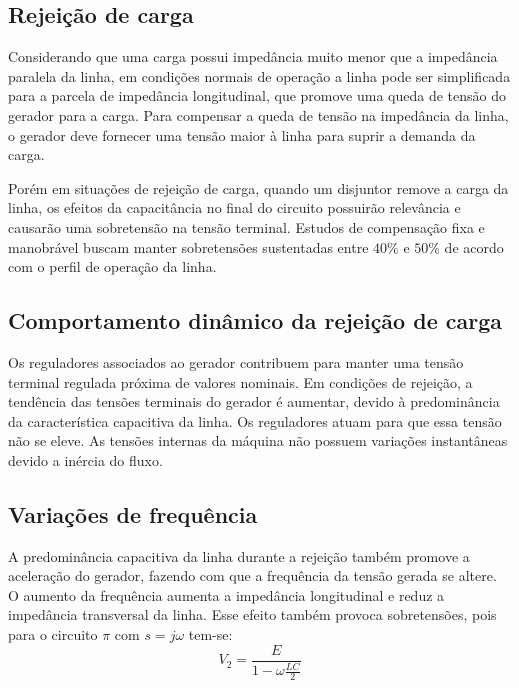 \subsection{Rejeição de carga}

Considerando que uma carga possui impedância muito menor que a impedância paralela da linha, em condições normais de operação a linha pode ser simplificada para a parcela de impedância longitudinal, que promove uma queda de tensão do gerador para a carga. Para compensar a queda de tensão na impedância da linha, o gerador deve fornecer uma tensão maior à linha para suprir a demanda da carga.

Porém em situações de rejeição de carga, quando um disjuntor remove a carga da linha, os efeitos da capacitância no final do circuito possuirão relevância e causarão uma sobretensão na tensão terminal. Estudos de compensação fixa e manobrável buscam manter sobretensões sustentadas entre $40\%$ e $50\%$ de acordo com o perfil de operação da linha.
\begin{comment}
Estudos de compensação de linha são voltados para permitir sobretensões sustentadas de rejeição de carga entre 1.4-1.5 pu, levando em conta o perfil das sobretensões na energização, rejeição, regime permanente e transitório de emergência. Os estudos permitem dimensionar reatores  fixos e compensação reativa manobrável com capacitores.
\end{comment}



\subsection{Comportamento dinâmico da rejeição de carga}

Os reguladores associados ao gerador contribuem para manter uma tensão terminal regulada próxima de valores nominais. Em condições de rejeição, a tendência das tensões terminais do gerador é aumentar, devido à predominância da característica capacitiva da linha. Os reguladores atuam para que essa tensão não se eleve. As tensões internas da máquina não possuem variações instantâneas devido a inércia do fluxo. 

\subsection{Variações de frequência}

A predominância capacitiva da linha durante a rejeição também promove a aceleração do gerador, fazendo com que a frequência da tensão gerada se altere. O aumento da frequência aumenta a impedância longitudinal e reduz a impedância transversal da linha. Esse efeito também provoca sobretensões, pois para o circuito $\pi$ com $s=j\omega$ tem-se:
\begin{equation} \label{top2:eq:potcc5}
V_2 = \frac{E}{1-\omega\frac{LC}{2}}
\end{equation}

